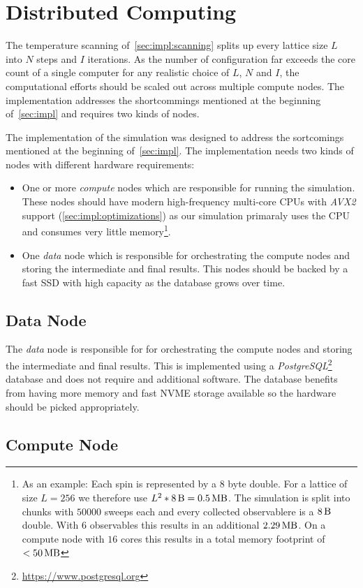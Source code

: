 \section{Distributed Computing}\label{sec:impl:computing}
	The temperature scanning of~\cref{sec:impl:scanning} splits up every lattice size $L$ into $N$ steps and $I$ iterations. As the number of configuration far exceeds the core count of a single computer for any realistic choice of $L$, $N$ and $I$, the computational efforts should be scaled out across multiple compute nodes. The implementation addresses the shortcommings mentioned at the beginning of~\cref{sec:impl} and requires two kinds of nodes.
	
	The implementation of the simulation was designed to address the sortcomings mentioned at the beginning of~\cref{sec:impl}. The implementation needs two kinds of nodes with different hardware requirements:
	\begin{itemize}
		\item One or more \emph{compute} nodes which are responsible for running the simulation. These nodes should have modern high-frequency multi-core CPUs with \emph{AVX2} support (\cref{sec:impl:optimizations}) as our simulation primaraly uses the CPU and consumes very little memory\footnote{As an example: Each spin is represented by a $8$ byte double. For a lattice of size $L = 256$ we therefore use $L^2 * \SI{8}{\byte} = \SI{0.5}{\mega\byte}$. The simulation is split into chunks with $\num{50000}$ sweeps each and every collected observablere is a $\SI{8}{\byte}$ double. With $\num{6}$ observables this results in an additional $\SI{2.29}{\mega\byte}$. On a compute node with $\num{16}$ cores this results in a total memory footprint of $< \SI{50}{\mega\byte}$}.
		\item One \emph{data} node which is responsible for orchestrating the compute nodes and storing the intermediate and final results. This nodes should be backed by a fast SSD with high capacity as the database grows over time.
	\end{itemize}
	
	\subsection{Data Node}
		The \emph{data} node is responsible for for orchestrating the compute nodes and storing the intermediate and final results. This is implemented using a  \emph{PostgreSQL}\footnote{\url{https://www.postgresql.org}} database and does not require and additional software. The database benefits from having more memory and fast NVME storage available so the hardware should be picked appropriately.
	
	\subsection{Compute Node}